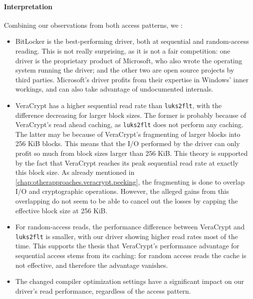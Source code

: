\paragraph{Interpretation}
Combining our observations from both access patterns, we : 
\begin{itemize}
	\item BitLocker is the best-performing driver, both at sequential and random-access reading. This is not really surprising, as it is not a fair competition: one driver is the proprietary product of Microsoft, who also wrote the operating system running the driver; and the other two are open source projects by third parties. Microsoft's driver profits from their expertise in Windows' inner workings, and can also take advantage of undocumented internals.
	\item VeraCrypt has a higher sequential read rate than \texttt{luks2flt}, with the difference decreasing for larger block sizes. The former is probably because of VeraCrypt's read ahead caching, as \texttt{luks2flt} does not perform any caching. The latter may be because of VeraCrypt's fragmenting of larger blocks into 256 KiB blocks. This means that the I/O performed by the driver can only profit so much from block sizes larger than 256 KiB. This theory is supported by the fact that VeraCrypt reaches its peak sequential read rate at exactly this block size. As already mentioned in \autoref{chap:otherapproaches.veracrypt.peeking}, the fragmenting is done to overlap I/O and cryptographic operations. However, the alleged gains from this overlapping do not seem to be able to cancel out the losses by capping the effective block size at 256 KiB.
	\item For random-access reads, the performance difference between VeraCrypt and \texttt{luks2flt} is smaller, with our driver showing higher read rates most of the time. This supports the thesis that VeraCrypt's performance advantage for sequential access stems from its caching: for random access reads the cache is not effective, and therefore the advantage vanishes.
	\item The changed compiler optimization settings have a significant impact on our driver's read performance, regardless of the access pattern.
\end{itemize}

